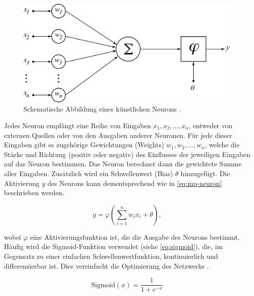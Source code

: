 \begin{figure}[h]
	\centering
	\vspace*{4mm}
	\includegraphics[width=12cm]{images/figure_mp-neuron_nd_edited1.png}
	\vspace*{2mm}
	\caption[Schematische Abbildung eines künstlichen Neurons.]{Schematische Abbildung eines künstlichen Neurons \parencite{WikiNeuronModel}.}
	\label{fig:neuron}
\end{figure}

Jedes Neuron empfängt eine Reihe von Eingaben $x_1, x_2, \dots, x_n$, entweder von externen Quellen oder von den Ausgaben anderer Neuronen. Für jede dieser Eingaben gibt es zugehörige Gewichtungen (Weights) $w_1, w_2, \dots, w_n$, welche die Stärke und Richtung (positiv oder negativ) des Einflusses der jeweiligen Eingaben auf das Neuron bestimmen. Das Neuron berechnet dann die gewichtete Summe aller Eingaben. Zusätzlich wird ein Schwellenwert (Bias) $\theta$ hinzugefügt. Die Aktivierung $y$ des Neurons kann dementsprechend wie in \autoref{eq:mp-neuron} beschrieben werden.

\begin{equation}
	y = \varphi \left( \sum_{i=1}^{n} w_{i} x_i + \theta \right),
	\label{eq:mp-neuron}
\end{equation}

wobei $\varphi$ eine Aktivierungsfunktion ist, die die Ausgabe des Neurons bestimmt. Häufig wird die Sigmoid-Funktion verwendet (siehe \autoref{eq:sigmoid}), die, im Gegensatz zu einer einfachen Schwellenwertfunktion, kontinuierlich und differenzierbar ist. Dies vereinfacht die Optimierung des Netzwerks \parencite{Zhou2021machinelearning}.

\begin{equation}
	\text{Sigmoid}(x) = \frac{1}{1 + e^{-x}}
	\label{eq:sigmoid}
\end{equation}

